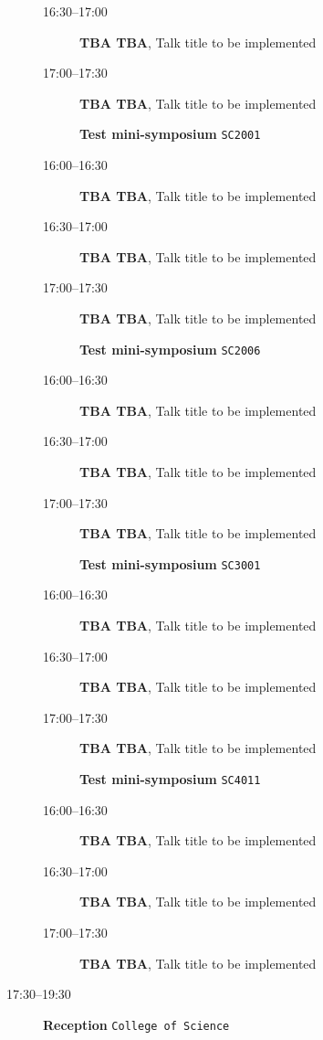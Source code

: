 \documentclass[ILAS2025-program.tex]{subfiles}
\begin{document}
\begin{description}
\begin{description}
        \item[16:30--17:00] \textbf{TBA TBA}, Talk title to be implemented
        \item[17:00--17:30] \textbf{TBA TBA}, Talk title to be implemented
        \end{description}
    \begin{description}
    \item[] \textbf{Test mini-symposium} {\footnotesize\texttt{SC2001}}
    \item[16:00--16:30] \textbf{TBA TBA}, Talk title to be implemented
        \item[16:30--17:00] \textbf{TBA TBA}, Talk title to be implemented
        \item[17:00--17:30] \textbf{TBA TBA}, Talk title to be implemented
        \end{description}
    \begin{description}
    \item[] \textbf{Test mini-symposium} {\footnotesize\texttt{SC2006}}
    \item[16:00--16:30] \textbf{TBA TBA}, Talk title to be implemented
        \item[16:30--17:00] \textbf{TBA TBA}, Talk title to be implemented
        \item[17:00--17:30] \textbf{TBA TBA}, Talk title to be implemented
        \end{description}
    \begin{description}
    \item[] \textbf{Test mini-symposium} {\footnotesize\texttt{SC3001}}
    \item[16:00--16:30] \textbf{TBA TBA}, Talk title to be implemented
        \item[16:30--17:00] \textbf{TBA TBA}, Talk title to be implemented
        \item[17:00--17:30] \textbf{TBA TBA}, Talk title to be implemented
        \end{description}
    \begin{description}
    \item[] \textbf{Test mini-symposium} {\footnotesize\texttt{SC4011}}
    \item[16:00--16:30] \textbf{TBA TBA}, Talk title to be implemented
        \item[16:30--17:00] \textbf{TBA TBA}, Talk title to be implemented
        \item[17:00--17:30] \textbf{TBA TBA}, Talk title to be implemented
        \end{description}
    \item[17:30--19:30] \textbf{Reception} {\footnotesize\texttt{College of Science}}
    \end{description}
    \newpage
\end{document}
